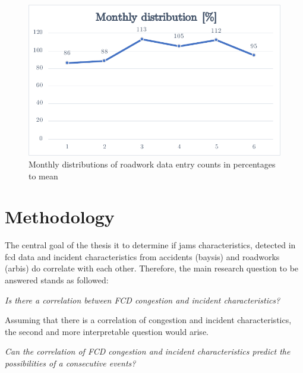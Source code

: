 \documentclass[a4paper,12pt]{report}
\begin{document}
\begin{figure}[h]
	\centering
	\includegraphics[scale=0.6]{./assets/arbis_dataset_monthly_percentage}
	\caption{Monthly distributions of roadwork data entry counts in percentages to mean}
	\label{img:arbis_dataset_monthly_percentage}
\end{figure}


%


\chapter{Methodology}
The central goal of the thesis it to determine if jams characteristics, detected in \acrshort{fcd} data and incident characteristics from accidents (\acrshort{baysis}) and roadworks (\acrshort{arbis}) do correlate with each other. Therefore, the main research question to be answered stands as followed:

\begin{center}
	\textit{Is there a correlation between FCD congestion and incident characteristics?}
\end{center}

\bigskip

\par Assuming that there is a correlation of congestion and incident characteristics, the second and more interpretable question would arise.

\begin{center}
	\textit{Can the correlation of FCD congestion and incident characteristics predict the possibilities of a consecutive events?}
\end{center}

\bigskip
\end{document}
